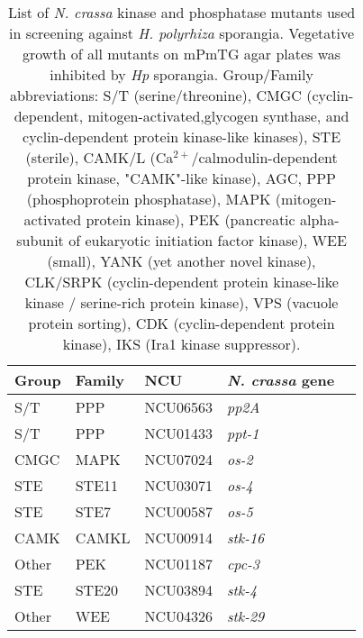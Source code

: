 
\vfill \break
\begin{table}[htbp]
\caption[List of \textit{N. crassa} mutants screened for sensitivity]{List of \textit{N. crassa} kinase and phosphatase mutants used in screening against \textit{H. polyrhiza} sporangia. Vegetative growth of all mutants on mPmTG agar plates was inhibited by \textit{Hp} sporangia. Group/Family abbreviations: S/T (serine/threonine), CMGC (cyclin-dependent, mitogen-activated,glycogen synthase, and cyclin-dependent protein kinase-like kinases), STE (sterile), CAMK/L (Ca$^{2+}$/calmodulin-dependent protein kinase, "CAMK"-like kinase), AGC, PPP (phosphoprotein phosphatase), MAPK (mitogen-activated protein kinase), PEK (pancreatic alpha-subunit of eukaryotic initiation factor kinase), WEE (small), YANK (yet another novel kinase), CLK/SRPK (cyclin-dependent protein kinase-like kinase / serine-rich protein kinase), VPS (vacuole protein sorting), CDK (cyclin-dependent protein kinase), IKS (Ira1 kinase suppressor).} 
\label{tab:ChInhib_Kinase}
\begin{tabular}{lllll}
  \hline
  Group & Family & NCU & \emph{N. crassa} gene \\ 
  \hline
 S/T & PPP & NCU06563 & \emph{pp2A} \\ 
  S/T & PPP & NCU01433 & \emph{ppt-1} \\ 
  CMGC & MAPK & NCU07024 & \emph{os-2} \\ 
  STE & STE11 & NCU03071 & \emph{os-4} \\ 
  STE & STE7 & NCU00587 & \emph{os-5} \\ 
  CAMK & CAMKL & NCU00914 & \emph{stk-16} \\ 
  Other & PEK & NCU01187 & \emph{cpc-3} \\ 
  STE & STE20 & NCU03894 & \emph{stk-4} \\ 
  Other & WEE & NCU04326 & \emph{stk-29} \\ 

\end{tabular}
\end{table}
